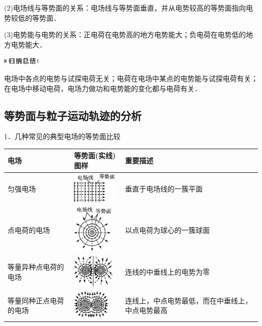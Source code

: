 \documentclass[cn,10.5pt,chinese,mac,chinesefont=founder]{elegantbook}
\begin{document}
(2)电场线与等势面的关系：电场线与等势面垂直，并从电势较高的等势面指向电势较低的等势面．

(3)电势能与电势的关系：正电荷在电势高的地方电势能大；负电荷在电势低的地方电势能大．



\begin{center}\includegraphics[width=0.70833in,height=0.125in]{media/image13.png}\end{center}
电场中各点的电势与试探电荷无关；电荷在电场中某点的电势能与试探电荷有关；在电场中移动电荷，电场力做功和电势能的变化都与电荷有关．
\newpage
\subsection{等势面与粒子运动轨迹的分析}

1．几种常见的典型电场的等势面比较

\begin{longtable}[]{@{}m{3cm}m{4cm}m{5cm}@{}}
\toprule
电场 & 等势面(实线)图样 & 重要描述\tabularnewline
\midrule
\endhead
匀强电场 & \includegraphics[width=0.84375in,height=0.58333in]{media/image276.png} &垂直于电场线的一簇平面\tabularnewline
点电荷的电场 &\includegraphics[width=0.77083in,height=0.90625in]{media/image277.png} &以点电荷为球心的一簇球面\tabularnewline

等量异种点电荷的电场& \includegraphics[width=0.79167in,height=0.625in]{media/image278.png}& 连线的中垂线上的电势为零\tabularnewline

等量同种正点电荷的电场& \includegraphics[width=0.70833in,height=0.55208in]{media/image279.png}& 连线上，中点电势最低，而在中垂线上，中点电势最高\tabularnewline
\bottomrule
\end{longtable}
\end{document}
